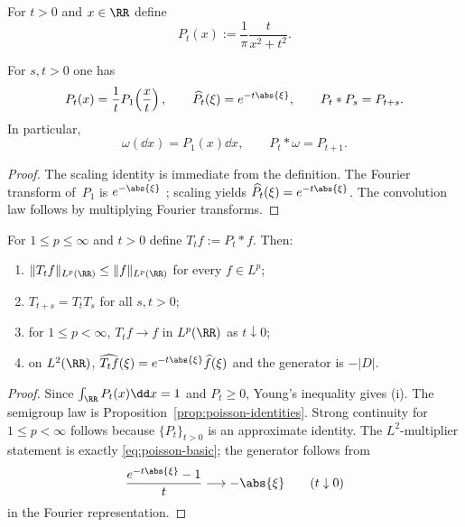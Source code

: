 For $t>0$ and $x\in\RR$ define
\begin{equation}\label{eq:poisson-kernel}
P_t(x):=\frac{1}{\pi}\frac{t}{x^{2}+t^{2}}.
\end{equation}

\begin{proposition}%
\label{prop:poisson-identities}
For $s,t>0$ one has
\begin{equation}\label{eq:poisson-basic}
P_t(x)=\frac{1}{t}P_1\!\left(\frac{x}{t}\right),
\qquad
\widehat{P_t}(\xi)=e^{-t\abs{\xi}},
\qquad
P_t*P_s=P_{t+s}.
\end{equation}
In particular,
\[
\omega(\dd x)=P_1(x)\dd x,
\qquad
P_t*\omega=P_{t+1}.
\]
\end{proposition}

\begin{proof}
The scaling identity is immediate from the definition.  The Fourier
transform of~$P_1$ is $e^{-\abs{\xi}}$
\cite[Chapter~III]{Stein1971}; scaling yields
$\widehat{P_t}(\xi)=e^{-t\abs{\xi}}$.  The convolution law follows by
multiplying Fourier transforms.
\end{proof}

\begin{proposition}%
\label{prop:poisson-semigroup-law}
For $1\le p\le\infty$ and $t>0$ define
$T_t f:=P_t*f$.  Then:
\begin{enumerate}[label=(\roman*)]
\item $\|T_t f\|_{L^p(\RR)}\le \|f\|_{L^p(\RR)}$ for every $f\in L^p$;
\item $T_{t+s}=T_tT_s$ for all $s,t>0$;
\item for $1\le p<\infty$, $T_t f\to f$ in $L^p(\RR)$ as $t\downarrow 0$;
\item on $L^2(\RR)$, $\widehat{T_t f}(\xi)=e^{-t\abs{\xi}}\widehat f(\xi)$
      and the generator is $-|D|$.
\end{enumerate}
\end{proposition}

\begin{proof}
Since $\int_{\RR}P_t(x)\dd x=1$ and $P_t\ge 0$, Young's inequality gives
(i).  The semigroup law is Proposition~\ref{prop:poisson-identities}.
Strong continuity for $1\le p<\infty$ follows because $\{P_t\}_{t>0}$ is
an approximate identity.  The $L^2$-multiplier statement is exactly
\eqref{eq:poisson-basic}; the generator follows from
\[
\frac{e^{-t\abs{\xi}}-1}{t}\longrightarrow -\abs{\xi}
\qquad(t\downarrow 0)
\]
in the Fourier representation.
\end{proof}

